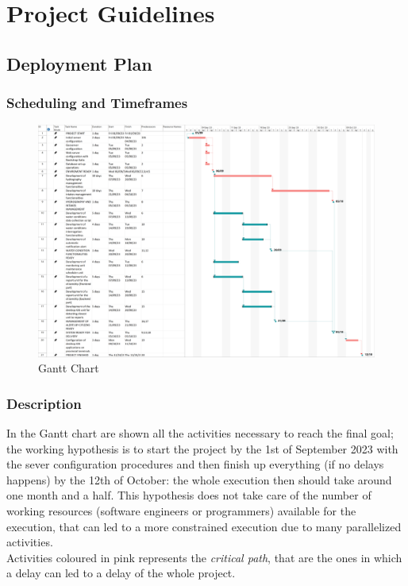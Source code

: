 \section{Project Guidelines}
\subsection{Deployment Plan}
\subsubsection{Scheduling and Timeframes}
   
\begin{figure}[H]
    \centering
    \includegraphics[width=\textwidth]{img/gantt.png}
    \caption{Gantt Chart}
    \label{Gantt}
\end{figure}

\subsubsection{Description}
In the Gantt chart are shown all the activities necessary to reach the final goal; the working hypothesis is to start the project by the 1st of September 2023 with the sever configuration procedures and then finish up everything (if no delays happens) by the 12th of October: the whole execution then should take around one month and a half.
This hypothesis does not take care of the number of working resources (software engineers or programmers) available for the execution, that can led to a more constrained execution due to many parallelized activities. \\
Activities coloured in pink represents the \textit{critical path}, that are the ones in which a delay can led to a delay of the whole project.

